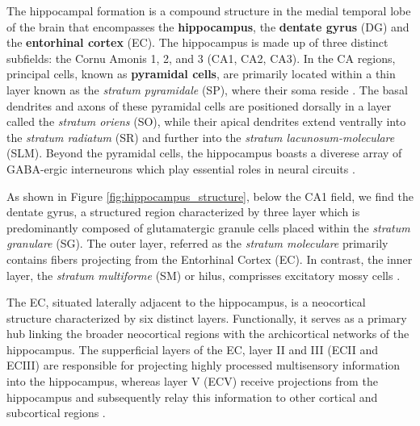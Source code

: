 \documentclass[../main.tex]{subfiles}
\begin{document}
The hippocampal formation is a compound structure in the medial temporal lobe of the brain that encompasses the \textbf{hippocampus}, the \textbf{dentate gyrus} (DG) and the \textbf{entorhinal cortex} (EC).
The hippocampus is made up of three distinct subfields: the Cornu Amonis 1, 2, and 3 (CA1, CA2, CA3).
In the CA regions, principal cells, known as \textbf{pyramidal cells}, are primarily located within a thin layer known as the \textit{stratum pyramidale} (SP), where their soma reside \citep{amaral2007hippocampal,buzsaki_memory_2013,lefebvre_development_2015}.
The basal dendrites and axons of these pyramidal cells are positioned dorsally in a layer called the \textit{stratum oriens} (SO), while their apical dendrites extend ventrally into the \textit{stratum radiatum} (SR) and further into the \textit{stratum lacunosum-moleculare} (SLM).
Beyond the pyramidal cells, the hippocampus boasts a diverese array of GABA-ergic interneurons which play essential roles in neural circuits \citep{petilla2008petilla,booker_morphological_2018, klausberger_gabaergic_2009}.

As shown in Figure \ref{fig:hippocampus_structure}, below the CA1 field, we find the dentate gyrus, a structured region characterized by three layer which is predominantly composed of glutamatergic granule cells placed within the \textit{stratum granulare} (SG).
The outer layer, referred as the \textit{stratum moleculare} primarily contains fibers projecting from the Entorhinal Cortex (EC).
In contrast, the inner layer, the \textit{stratum multiforme} (SM) or hilus, comprisses excitatory mossy cells \citep{amaral2007hippocampal,buzsaki_memory_2013,lefebvre_development_2015}.

The EC, situated laterally adjacent to the hippocampus, is a neocortical structure characterized by six distinct layers.
Functionally, it serves as a primary hub linking the broader neocortical regions with the archicortical networks of the hippocampus. 
The supperficial layers of the EC, layer II and III (ECII and ECIII) are responsible for projecting highly processed multisensory information into the hippocampus,
whereas layer V (ECV) receive projections from the hippocampus and subsequently relay this information to other cortical and subcortical regions \citep{amaral2007hippocampal,buzsaki_memory_2013,lefebvre_development_2015}.
\end{document}
